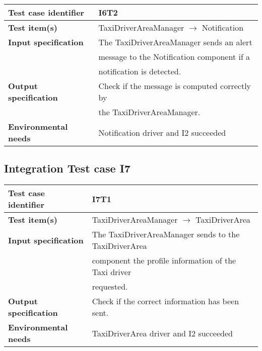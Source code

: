 		\vspace{1cm}
		\noindent
		\begin{adjustbox}{max width=\textwidth}
			\begin{tabular}{ l l}
				\hline 		\textbf{Test case identifier} & I6T2 \\
				\hline		\textbf{Test item(s)} & TaxiDriverAreaManager $\rightarrow$ Notification \\
				\hline		\textbf{Input specification} & The TaxiDriverAreaManager sends an alert \\ & message to the Notification component if a\\& notification is detected.\\
				\hline		\textbf{Output specification} & Check if the message is computed correctly by \\ & the TaxiDriverAreaManager.\\
				\hline		\textbf{Environmental needs} & Notification driver and I2 succeeded\\
				\hline
			\end{tabular}
		\end{adjustbox}
	
	\hypertarget{chapter 3.7}{ }
	\subsection{Integration Test case I7}
		\begin{adjustbox}{max width=\textwidth}
			\begin{tabular}{ l l}
				\hline 		\textbf{Test case identifier} & I7T1 \\
				\hline		\textbf{Test item(s)}  & TaxiDriverAreaManager $\rightarrow$ TaxiDriverArea \\
				\hline		\textbf{Input specification} & The TaxiDriverAreaManager sends to the TaxiDriverArea\\ & component the profile information of the Taxi driver\\ & requested.\\
				\hline		\textbf{Output specification} & Check if the correct information has been sent.\\
				\hline		\textbf{Environmental needs} & TaxiDriverArea driver and I2 succeeded\\
				\hline
			\end{tabular}
		\end{adjustbox}
		
